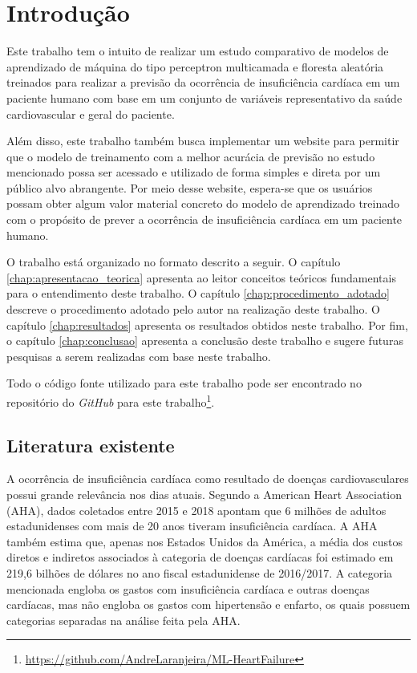 \chapter{Introdução} \label{chap:introducao}

Este trabalho tem o intuito de realizar um estudo comparativo de modelos de aprendizado de máquina do tipo perceptron multicamada e floresta aleatória treinados para realizar a previsão da ocorrência de insuficiência cardíaca em um paciente humano com base em um conjunto de variáveis representativo da saúde cardiovascular e geral do paciente.

Além disso, este trabalho também busca implementar um website para permitir que o modelo de treinamento com a melhor acurácia de previsão no estudo mencionado possa ser acessado e utilizado de forma simples e direta por um público alvo abrangente. Por meio desse website, espera-se que os usuários possam obter algum valor material concreto do modelo de aprendizado treinado com o propósito de prever a ocorrência de insuficiência cardíaca em um paciente humano.

O trabalho está organizado no formato descrito a seguir. O capítulo \ref{chap:apresentacao_teorica} apresenta ao leitor conceitos teóricos fundamentais para o entendimento deste trabalho. O capítulo \ref{chap:procedimento_adotado} descreve o procedimento adotado pelo autor na realização deste trabalho. O capítulo \ref{chap:resultados} apresenta os resultados obtidos neste trabalho. Por fim, o capítulo \ref{chap:conclusao} apresenta a conclusão deste trabalho e sugere futuras pesquisas a serem realizadas com base neste trabalho.

Todo o código fonte utilizado para este trabalho pode ser encontrado no repositório do \textit{GitHub} para este trabalho\footnote{\url{https://github.com/AndreLaranjeira/ML-HeartFailure}}.

\section{Literatura existente}

A ocorrência de insuficiência cardíaca como resultado de doenças cardiovasculares possui grande relevância nos dias atuais. Segundo a American Heart Association (AHA), dados coletados entre 2015 e 2018 apontam que 6 milhões de adultos estadunidenses com mais de 20 anos tiveram insuficiência cardíaca\cite[p.8]{heart_disease2021}. A AHA também estima que, apenas nos Estados Unidos da América, a média dos custos diretos e indiretos associados à categoria de doenças cardíacas foi estimado em 219,6 bilhões de dólares no ano fiscal estadunidense de 2016/2017\cite[p.481]{heart_disease2021}. A categoria mencionada engloba os gastos com insuficiência cardíaca e outras doenças cardíacas, mas não engloba os gastos com hipertensão e enfarto, os quais possuem categorias separadas na análise feita pela AHA.

